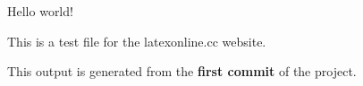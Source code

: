 \documentclass{article}
\begin{document}
Hello world!

This is a test file for the latexonline.cc website.

This output is generated from the \textbf{first commit} of the project.
\end{document}
